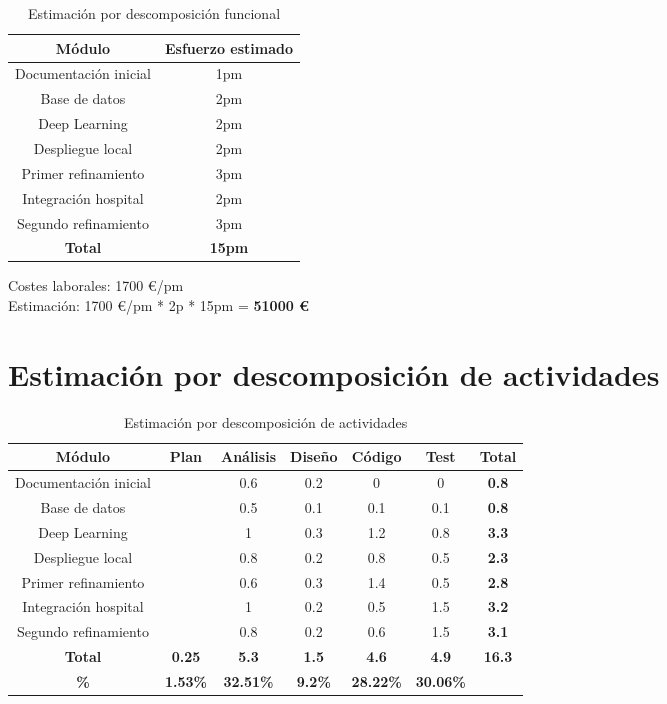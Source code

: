 \begin{table}[H]
	\begin{center}
		\begin{tabular}{|c||c|}
			\hline 
			Módulo & Esfuerzo estimado \\
			\hline \hline
			Documentación inicial & 1pm \\ \hline
			Base de datos & 2pm \\ \hline
			Deep Learning & 2pm \\ \hline
			Despliegue local & 2pm \\ \hline
			Primer refinamiento & 3pm \\ \hline
			Integración hospital & 2pm \\ \hline
			Segundo refinamiento & 3pm \\ \hline
			\textbf{Total} & \textbf{15pm} \\ \hline
		\end{tabular}
		\caption{Estimación por descomposición funcional}
		\label{tabla:funcional}
	\end{center}
\end{table}

Costes laborales: 1700 \euro/pm\\
Estimación: 1700 \euro/pm * 2p * 15pm = \textbf{51000 \euro}

\section{Estimación por descomposición de actividades}

\begin{table}[H]
	\begin{center}
		\begin{tabular}{|c|c|c|c|c|c||c|}
			\hline 
			Módulo & Plan & Análisis & Diseño & Código & Test & \textbf{Total} \\
			\hline \hline
			Documentación inicial & & 0.6 & 0.2 & 0 & 0 & \textbf{0.8}  \\ \hline
			Base de datos & & 0.5 & 0.1 & 0.1 & 0.1 & \textbf{0.8}  \\ \hline
			Deep Learning & & 1 & 0.3 & 1.2 & 0.8 & \textbf{3.3}  \\ \hline
			Despliegue local & & 0.8 & 0.2 & 0.8 & 0.5 & \textbf{2.3}  \\ \hline
			Primer refinamiento & & 0.6 & 0.3 & 1.4 & 0.5 & \textbf{2.8}  \\ \hline
			Integración hospital & & 1 & 0.2 & 0.5 & 1.5 & \textbf{3.2}  \\ \hline
			Segundo refinamiento & & 0.8 & 0.2 & 0.6 & 1.5 & \textbf{3.1}  \\ \hline
			\textbf{Total} & \textbf{0.25} & \textbf{5.3} & \textbf{1.5} & \textbf{4.6} & \textbf{4.9} & \textbf{16.3}  \\ \hline
			\textbf{    \%} & \textbf{1.53\%} & \textbf{32.51\%} & \textbf{9.2\%} & \textbf{28.22\%} & \textbf{30.06\%} & \textbf{}  \\ \hline
		\end{tabular}
		\caption{Estimación por descomposición de actividades}
		\label{tabla:actividades}
	\end{center}
\end{table}

